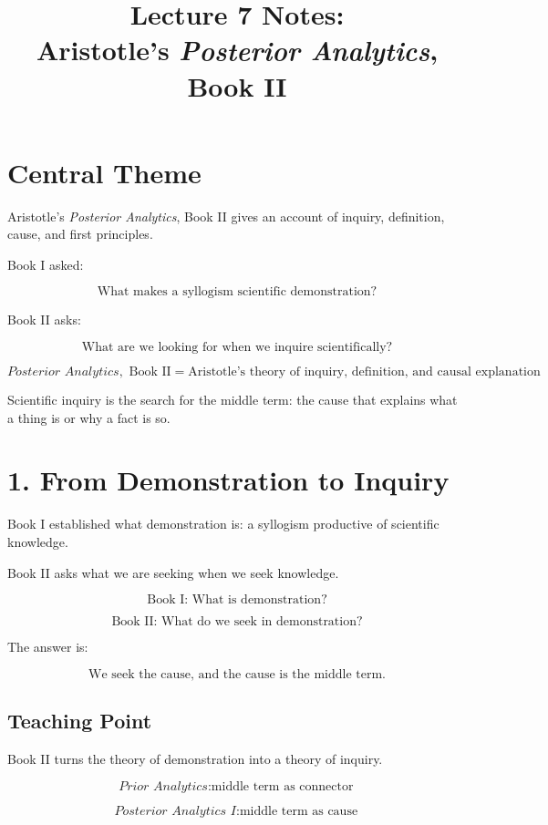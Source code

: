 \documentclass[12pt]{article}
\title{Lecture 7 Notes: \\ Aristotle's \textit{Posterior Analytics}, Book II}
\author{}
\date{}
\begin{document}
\maketitle

\section*{Central Theme}

Aristotle's \textit{Posterior Analytics}, Book II gives an account of inquiry,
definition, cause, and first principles.

Book I asked:

\[
\text{What makes a syllogism scientific demonstration?}
\]

Book II asks:

\[
\text{What are we looking for when we inquire scientifically?}
\]

\[
\boxed{
\textit{Posterior Analytics}, \text{ Book II}
=
\text{Aristotle's theory of inquiry, definition, and causal explanation}
}
\]

Scientific inquiry is the search for the middle term: the cause that explains
what a thing is or why a fact is so.

\section*{1. From Demonstration to Inquiry}

Book I established what demonstration is: a syllogism productive of scientific
knowledge.

Book II asks what we are seeking when we seek knowledge.

\[
\text{Book I: What is demonstration?}
\]

\[
\text{Book II: What do we seek in demonstration?}
\]

The answer is:

\[
\boxed{
\text{We seek the cause, and the cause is the middle term.}
}
\]

\subsection*{Teaching Point}

Book II turns the theory of demonstration into a theory of inquiry.

\[
\textit{Prior Analytics}: \text{middle term as connector}
\]

\[
\textit{Posterior Analytics I}: \text{middle term as cause}
\]
\end{document}
